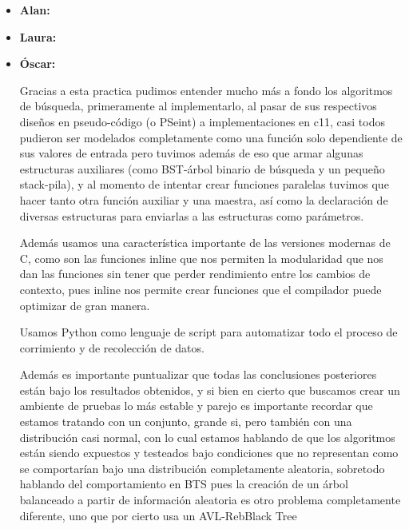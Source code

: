 \documentclass[12pt, fleqn]{article}                             %
\theoremstyle{break}                                            %
\begin{document}
\begin{itemize}\setlength\itemsep{0em}

    \item \textbf{Alan:} 
    
    
    \item \textbf{Laura:} 
    
    
    \item \textbf{Óscar:} 
    
                Gracias a esta practica pudimos entender mucho más a fondo los algoritmos de búsqueda,
        primeramente al implementarlo, al pasar de sus respectivos 
        diseños en pseudo-código (o PSeint) a implementaciones en c11, casi todos pudieron ser
        modelados completamente como una función solo dependiente de sus valores de entrada
        pero tuvimos además de eso que armar algunas estructuras auxiliares (como BST-árbol
        binario de búsqueda y un pequeño stack-pila), y al momento de intentar crear funciones paralelas
        tuvimos que hacer tanto otra función auxiliar y una maestra, así como la declaración de diversas estructuras
        para enviarlas a las estructuras como parámetros.

        Además usamos una característica importante de las versiones modernas de C, como son las funciones
        inline que nos permiten la modularidad que nos dan las funciones
        sin tener que perder rendimiento entre los cambios de contexto, pues inline nos permite crear
        funciones que el compilador puede optimizar de gran manera.
        
        Usamos Python como lenguaje de script para automatizar todo el proceso de corrimiento y de recolección de datos.
        
        Además es importante puntualizar que todas las conclusiones posteriores están bajo los resultados obtenidos, y si bien en cierto que buscamos
        crear un ambiente de pruebas lo más estable y parejo es importante recordar que estamos tratando con un conjunto, grande si, pero también con
        una distribución casi normal, con lo cual estamos hablando de que los algoritmos están siendo expuestos y testeados bajo condiciones que no 
        representan como se comportarían bajo una distribución completamente aleatoria, sobretodo hablando del comportamiento en BTS pues la creación
        de un árbol balanceado a partir de información aleatoria es otro problema completamente diferente, uno que por cierto usa un AVL-RebBlack Tree
        

\end{itemize}
\end{document}
